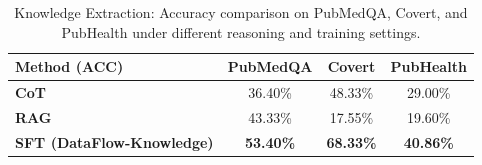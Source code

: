 \begin{table}[t]
\centering
\small
\caption{Knowledge Extraction: Accuracy comparison on PubMedQA, Covert, and PubHealth under different reasoning and training settings.}
\label{tab:kbc-result}
\begin{tabular}{lccc}
\toprule
\textbf{Method (ACC)} & \textbf{PubMedQA} & \textbf{Covert} & \textbf{PubHealth} \\
\midrule
\textbf{CoT} & 36.40\% & 48.33\% & 29.00\% \\
\textbf{RAG} & 43.33\% & 17.55\% & 19.60\% \\
\textbf{SFT (DataFlow-Knowledge)} & \textbf{53.40\%} & \textbf{68.33\%} & \textbf{40.86\%} \\
\bottomrule
\end{tabular}

\end{table}
